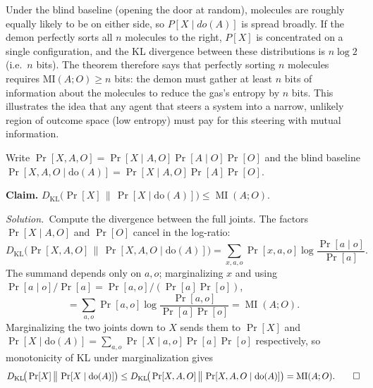 \documentclass[11pt]{article}
\newcommand{\DKL}{D_{\mathrm{KL}}}
\DeclareMathOperator{\MI}{MI}
\newcommand{\doo}[1]{\mathrm{do}(#1)}
\newcommand{\soln}{\medskip\noindent\textit{Solution.}\ }
\begin{document}
\begin{exercise}
\medskip
\noindent
Under the blind baseline (opening the door at random), molecules are roughly equally
likely to be on either side, so $P[X \mid do(A)]$ is spread broadly. If the demon
perfectly sorts all $n$ molecules to the right, $P[X]$ is concentrated on a single
configuration, and the KL divergence between these distributions is $n \log 2$ (i.e.\
$n$ bits). The theorem therefore says that perfectly sorting $n$ molecules requires
$\mathrm{MI}(A; O) \geq n$ bits: the demon must gather at least $n$ bits of
information about the molecules to reduce the gas's entropy by $n$ bits.
This illustrates the idea that any agent that steers a system into a narrow, unlikely region of outcome space (low entropy) must pay for this steering with mutual information. 
\end{exercise}

\begin{solution}[ex:do-divergence]
Write $\Pr[X,A,O]=\Pr[X\mid A,O]\Pr[A\mid O]\Pr[O]$ and the blind baseline $\Pr[X,A,O\mid\doo{A}]=\Pr[X\mid A,O]\Pr[A]\Pr[O]$.

\textbf{Claim.}
$\DKL\!\big(\Pr[X]\,\big\|\,\Pr[X\mid\doo{A}]\big)\le\MI(A;O)$.


\soln Compute the divergence between the full joints. The factors $\Pr[X\mid A,O]$ and $\Pr[O]$ cancel in the log-ratio:
\[
  \DKL\!\big(\Pr[X,A,O]\,\big\|\,\Pr[X,A,O\mid\doo{A}]\big)
  =\sum_{x,a,o}\Pr[x,a,o]\log\frac{\Pr[a\mid o]}{\Pr[a]}.
\]
The summand depends only on $a,o$; marginalizing $x$ and using $\Pr[a\mid o]/\Pr[a]=\Pr[a,o]/(\Pr[a]\Pr[o])$,
\[
  =\sum_{a,o}\Pr[a,o]\log\frac{\Pr[a,o]}{\Pr[a]\Pr[o]}=\MI(A;O).
\]
Marginalizing the two joints down to $X$ sends them to $\Pr[X]$ and $\Pr[X\mid\doo{A}]=\sum_{a,o}\Pr[X\mid a,o]\Pr[a]\Pr[o]$ respectively, so monotonicity of KL under marginalization gives
\[
  \DKL\!\big(\Pr[X]\,\big\|\,\Pr[X\mid\doo{A}]\big)\le\DKL\!\big(\Pr[X,A,O]\,\big\|\,\Pr[X,A,O\mid\doo{A}]\big)=\MI(A;O). \qedhere
\]
\end{solution}
\end{document}
